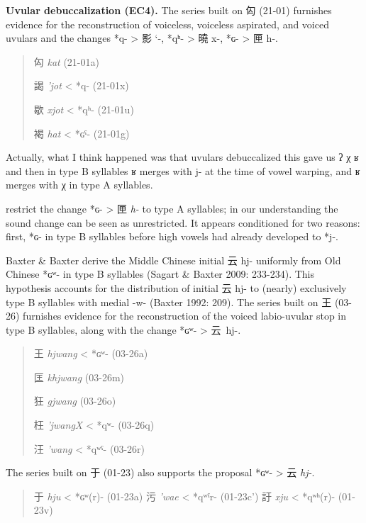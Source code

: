 \documentclass[xetex, svgnames, 12pt]{scrartcl}
\newcounter{para}
\newcommand\mypara[1]{\par\refstepcounter{para}\textbf{\thepara\space#1\space}}
\begin{document}
\mypara{Uvular debuccalization (EC4).}
\label{par:uvulardebuc}
The series built on 匃 (21-01) furnishes evidence for the reconstruction of voiceless, voiceless aspirated, and voiced uvulars and the changes *q- > 影 `-, *qʰ- > 曉 x-, *ɢ- > 匣 h-. 
\begin{quote}
匃 \textit{kat} (21-01a)

謁 \textit{'jot} < *q- (21-01x)

歇 \textit{xjot} < *qʰ- (21-01u)

褐 \textit{hat} < *ɢˤ- (21-01g)
\end{quote}

Actually, what I think happened was that uvulars debuccalized this gave us ʔ χ ʁ and then in type B syllables ʁ merges with j- at the time of vowel warping, and ʁ merges with χ in type A syllables.  

\citeauthor[PAGES]{Baxter2014OldChinese} restrict the change *ɢ- > 匣 \textit{h-} to type A syllables; in our understanding the sound change can be seen as unrestricted. It appears conditioned for two reasons: first, *ɢ- in type B syllables before high vowels had already developed to *j-. 

Baxter \& Baxter derive the Middle Chinese initial 云 hj- uniformly from Old Chinese *ɢʷ- in type B syllables (Sagart \& Baxter 2009: 233-234). This hypothesis accounts for the distribution of initial 云 hj- to (nearly) exclusively type B syllables with medial -w- (Baxter 1992: 209). The series built on 王 (03-26) furnishes evidence for the reconstruction of the voiced labio-uvular stop in type B syllables, along with the change *ɢʷ- > 云 hj-.
\begin{quote}
王 \textit{hjwang} < *ɢʷ- (03-26a) 

匡 \textit{khjwang} (03-26m) 

狂 \textit{gjwang} (03-26o) 

枉 \textit{'jwangX} < *qʷ- (03-26q) 

汪 \textit{'wang} < *qʷˤ- (03-26r) 
\end{quote}
The series built on 于 (01-23) also supports the proposal *ɢʷ- > 云 \textit{hj-}. 
\begin{quote}
于 \textit{hju} < *ɢʷ(r)- (01-23a)
污 \textit{'wae} < *qʷˤr- (01-23c')
訏 \textit{xju} < *qʷʰ(r)- (01-23v)
\end{quote}
\end{document}
